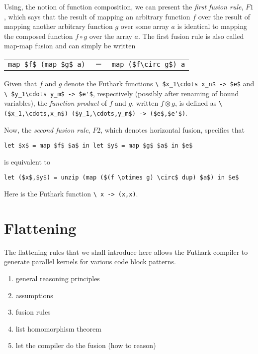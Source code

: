 \documentclass[oneside,11pt]{book}
\begin{document}
Using, the notion of function composition, we can present the
\emph{first fusion rule}, $F1$, which says that the result of mapping an
arbitrary function $f$ over the result of mapping another arbitrary
function $g$ over some array $a$ is identical to mapping the composed
function $f\circ g$ over the array $a$. The first fusion rule is
also called map-map fusion and can simply be written

\begin{tabular}{rcl}
  \lstinline[mathescape=true]!map $f$ (map $g$ a)! & $=$ & \lstinline[mathescape=true]!map ($f\circ g$) a!
\end{tabular}

Given that $f$ and $g$ denote the Futhark functions
%
\lstinline[mathescape=true]!\ $x_1\cdots x_n$ -> $e$! and
%
\lstinline[mathescape=true]!\ $y_1\cdots y_m$ -> $e'$!, respectively (possibly after renaming of bound variables),
the \emph{function product} of $f$ and $g$, written $f \otimes g$, is defined as
\lstinline[mathescape=true]!\ ($x_1,\cdots,x_n$) ($y_1,\cdots,y_m$) -> ($e$,$e'$)!.

Now, the \emph{second fusion rule}, $F2$, which denotes horizontal fusion,
specifies that
\begin{lstlisting}[mathescape=true]
  let $x$ = map $f$ $a$ in let $y$ = map $g$ $a$ in $e$
\end{lstlisting}

\noindent
is equivalent to

\begin{lstlisting}[mathescape=true]
  let ($x$,$y$) = unzip (map ($(f \otimes g) \circ$ dup) $a$) in $e$
\end{lstlisting}

\noindent
Here  is the Futhark function \lstinline!\ x -> (x,x)!.

\section{Flattening}

The flattening rules that we shall introduce here allows the Futhark
compiler to generate parallel kernels for various code block patterns.

\begin{enumerate}
\item general reasoning principles
\item assumptions
\item fusion rules
\item list homomorphism theorem
\item let the compiler do the fusion (how to reason)
\end{enumerate}
\end{document}
